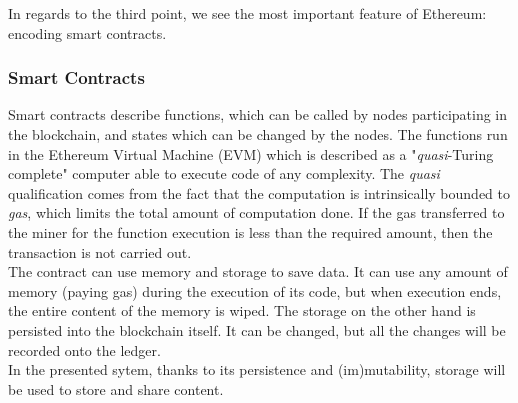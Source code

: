 \documentclass[conference,compsoc]{IEEEtran}
\begin{document}
In regards to the third point, we see the most important feature of Ethereum: encoding smart contracts. 


\subsubsection{Smart Contracts}

Smart contracts describe functions, which can be called by nodes participating in the blockchain, and states which can be changed by the nodes. 
The functions run in the Ethereum Virtual Machine (EVM)
which is described as a "\textit{quasi}-Turing complete" computer able to execute code of any complexity. The \textit{quasi} qualification comes from the
fact that the computation is intrinsically bounded to \textit{gas}, which limits the total amount of computation done.
If the gas transferred to the miner for the function execution is less than the required amount, then the transaction is not carried out.  
\\The contract can use memory and storage to save data. It can use any amount of memory (paying gas) during the execution of its code, but when execution ends, the entire content of the memory is wiped. The storage on the other hand is persisted into the blockchain itself. It can be changed, but all the changes will be recorded onto the ledger.\\
In the presented sytem, thanks to its persistence and (im)mutability, storage will be used to store and share content. 
\end{document}
